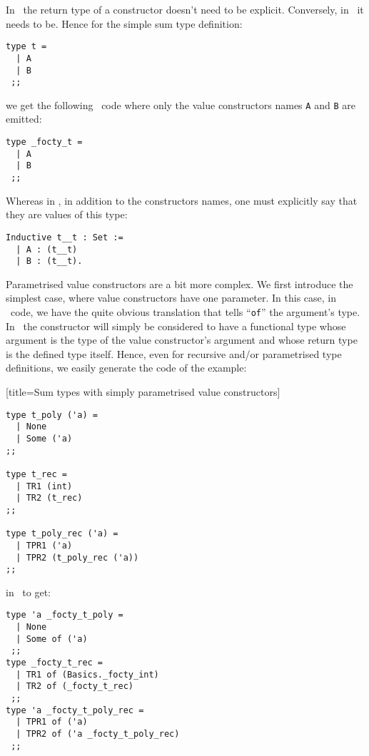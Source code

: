 In \ocaml\ the return type of a constructor doesn't need to be
explicit. Conversely, in \coq\ it needs to be. Hence for the simple
sum type definition:
{\footnotesize
\begin{lstlisting}[title=Simple sum type in \focalize]
type t =
  | A
  | B
 ;;
\end{lstlisting}
}
we get the following \ocaml\ code where only the value constructors
names {\tt A} and {\tt B} are emitted:
{\footnotesize
\begin{lstlisting}[language=MyOCaml,
                   title=Simple sum type generated in \ocaml]
type _focty_t = 
  | A
  | B
 ;;
\end{lstlisting}
}
Whereas in \coq, in addition to the constructors names, one must
explicitly say that they are values of this type:
{\footnotesize
\begin{lstlisting}[language=MyCoq,
                   title=Simple sum type generated in \coq]
Inductive t__t : Set := 
  | A : (t__t)
  | B : (t__t).
\end{lstlisting}
}

\medskip
Parametrised value constructors are a bit more complex. We first
introduce the simplest case, where value constructors have one
parameter. In this case, in \ocaml\ code, we have the quite obvious
translation that tells ``{\tt of}'' the argument's type. In \coq\,
the constructor will simply be considered to have a functional type
whose argument is the type of the value constructor's argument and
whose return type is the defined type itself.
Hence, even for recursive and/or parametrised type definitions, we
easily generate the code of the example:
{\footnotesize[title=Sum types with simply parametrised value constructors]
\begin{lstlisting}
type t_poly ('a) =
  | None
  | Some ('a)
;;

type t_rec =
  | TR1 (int)
  | TR2 (t_rec)
;;

type t_poly_rec ('a) =
  | TPR1 ('a)
  | TPR2 (t_poly_rec ('a))
;;
\end{lstlisting}
}
\noindent in \ocaml\ to get:
{\footnotesize
\begin{lstlisting}[language=MyOCaml, title=Sum type generated in \ocaml]
type 'a _focty_t_poly = 
  | None
  | Some of ('a)
 ;;
type _focty_t_rec = 
  | TR1 of (Basics._focty_int)
  | TR2 of (_focty_t_rec)
 ;;
type 'a _focty_t_poly_rec = 
  | TPR1 of ('a)
  | TPR2 of ('a _focty_t_poly_rec)
 ;;
\end{lstlisting}
}

